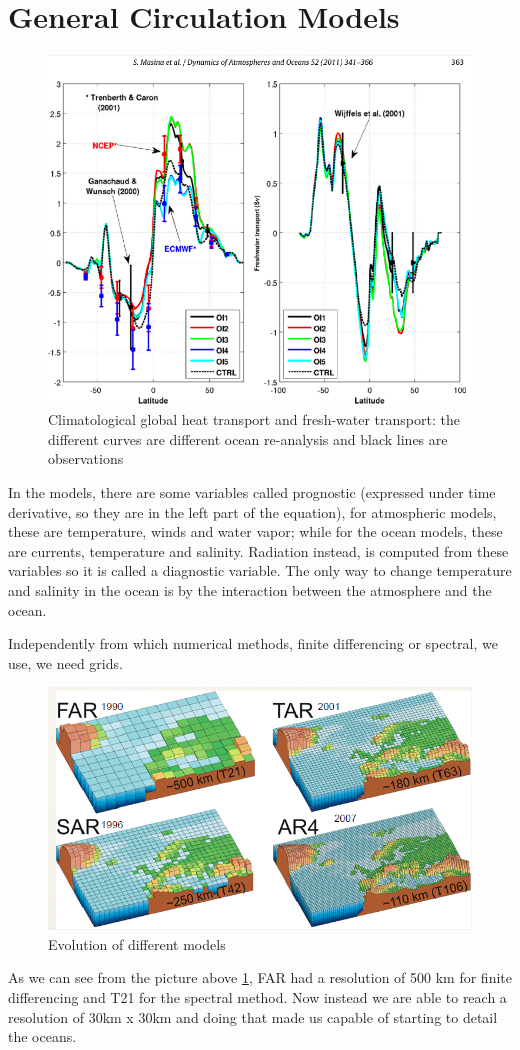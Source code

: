 \section{General Circulation Models }
\begin{figure}[htpb]
    \centering
    \includegraphics[width=0.4\linewidth]{uploads/image8.png}
    \caption{Climatological global heat transport and fresh-water transport: the different curves are different ocean re-analysis and black lines are observations}
    
\end{figure}
In the models, there are some variables called prognostic (expressed under time derivative, so they are in the left part of the equation), for atmospheric models, these are temperature, winds and water vapor; while for the ocean models, these are currents, temperature and salinity. Radiation instead, is computed from these variables so it is called a diagnostic variable.
The only way to change temperature and salinity in the ocean is by the interaction between the atmosphere and the ocean. 

Independently from which numerical methods, finite differencing or spectral, we use, we need grids. 
\begin{figure}[htp!]
    \centering
    \includegraphics[width=0.4\linewidth]{uploads/Screenshot 2024-11-20 213227.png}
    \caption{Evolution of different models}
    \label{fig:grids evolution}
    
\end{figure}
As we can see from the picture above \ref{fig:grids evolution}, FAR had a resolution of 500 km for finite differencing and T21 for the spectral method. Now instead we are able to reach a resolution of 30km x 30km and doing that made us capable of starting to detail the oceans. 


